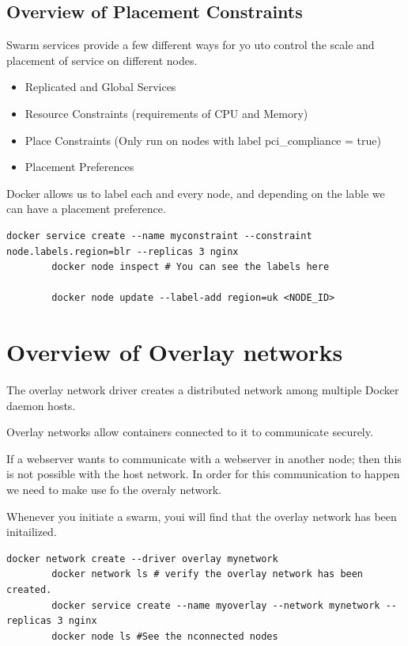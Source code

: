 \documentclass[11pt]{book}
\begin{document}
    \subsection{Overview of Placement Constraints}
    Swarm services provide a few different ways for yo uto control the scale and placement of service on different nodes.
    \begin{itemize}
        \item Replicated and Global Services
        \item Resource Constraints (requirements of CPU and Memory)
        \item Place Constraints (Only run on nodes with label pci_compliance = true)
        \item Placement Preferences
    \end{itemize}

    Docker allows us to label each and every node, and depending on the lable we can have a placement preference.

    \begin{lstlisting}[style=terminal]
        docker service create --name myconstraint --constraint node.labels.region=blr --replicas 3 nginx
        docker node inspect # You can see the labels here

        docker node update --label-add region=uk <NODE_ID>
    \end{lstlisting}

    \section{Overview of Overlay networks}
    The overlay network driver creates a distributed network among multiple Docker daemon hosts.

    Overlay networks allow containers connected to it to communicate securely.

    If a webserver wants to communicate with a webserver in another node; then this is not possible with the host network.
    In order for this communication to happen we need to make use fo the overaly network.

    Whenever you initiate a swarm, youi will find that the overlay network has been initailized.

    \begin{lstlisting}[style=terminal]
        docker network create --driver overlay mynetwork
        docker network ls # verify the overlay network has been created.
        docker service create --name myoverlay --network mynetwork --replicas 3 nginx
        docker node ls #See the nconnected nodes
    \end{lstlisting}
    
\end{document}
